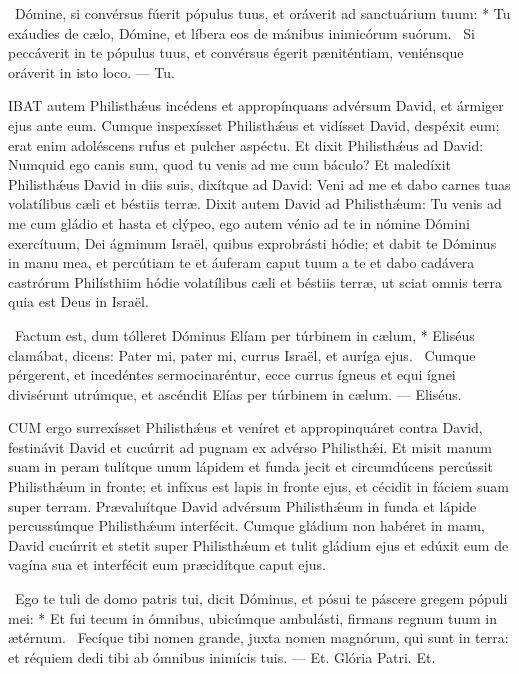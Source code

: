 \R\ Dómine, si convérsus fúerit pópulus tuus, et oráverit ad sanctuárium tuum: * Tu exáudies de cælo, Dómine, et líbera eos de mánibus inimicórum suórum. \V\ Si peccáverit in te pópulus tuus, et convérsus égerit pæniténtiam, veniénsque oráverit in isto loco. --- Tu.


\lettrine[lines=2]{I}{BAT} autem Philisthǽus incédens et appropínquans advérsum David, et ármiger ejus ante eum. Cumque inspexísset Philisthǽus et vidísset David, despéxit eum; erat enim adoléscens rufus et pulcher aspéctu. Et dixit Philisthǽus ad David: Numquid ego canis sum, quod tu venis ad me cum báculo? Et maledíxit Philisthǽus David in diis suis, dixítque ad David: Veni ad me et dabo carnes tuas volatílibus cæli et béstiis terræ. Dixit autem David ad Philisthǽum: Tu venis ad me cum gládio et hasta et clýpeo, ego autem vénio ad te in nómine Dómini exercítuum, Dei ágminum Israël, quibus exprobrásti hódie; et dabit te Dóminus in manu mea, et percútiam te et áuferam caput tuum a te et dabo cadávera castrórum Philísthiim hódie volatílibus cæli et béstiis terræ, ut sciat omnis terra quia est Deus in Israël.

\R\ Factum est, dum tólleret Dóminus Elíam per túrbinem in cælum, * Eliséus clamábat, dicens: Pater mi, pater mi, currus Israël, et auríga ejus. \V\ Cumque pérgerent, et incedéntes sermocinaréntur, ecce currus ígneus et equi ígnei divisérunt utrúmque, et ascéndit Elías per túrbinem in cælum. --- Eliséus.



\lettrine[lines=2]{C}{UM} ergo surrexísset Philisthǽus et veníret et appropinquáret contra David, festinávit David et cucúrrit ad pugnam ex advérso Philisthǽi. Et misit manum suam in peram tulítque unum lápidem et funda jecit et circumdúcens percússit Philisthǽum in fronte; et infíxus est lapis in fronte ejus, et cécidit in fáciem suam super terram. Prævaluítque David advérsum Philisthǽum in funda et lápide percussúmque Philisthǽum interfécit. Cumque gládium non habéret in manu, David cucúrrit et stetit super Philisthǽum et tulit gládium ejus et edúxit eum de vagína sua et interfécit eum præcidítque caput ejus.

\R\ Ego te tuli de domo patris tui, dicit Dóminus, et pósui te páscere gregem pópuli mei: * Et fui tecum in ómnibus, ubicúmque ambulásti, firmans regnum tuum in ætérnum. \V\ Fecíque tibi nomen grande, juxta nomen magnórum, qui sunt in terra: et réquiem dedi tibi ab ómnibus inimícis tuis. --- Et. Glória Patri. Et.

